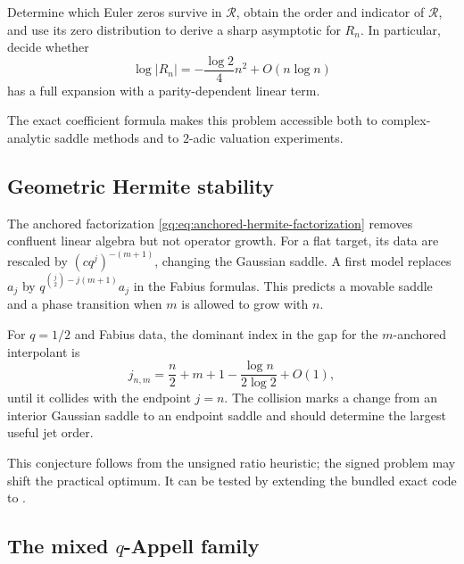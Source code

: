 \begin{problem}
\label{gq:prob:boundary-entire-zeros}
Determine which Euler zeros survive in $\mathcal R$, obtain the order and
indicator of $\mathcal R$, and use its zero distribution to derive a sharp
asymptotic for $R_n$.  In particular, decide whether
\begin{equation}
 \log|R_n|=-\frac{\log2}{4}n^2+O(n\log n)
 \label{gq:eq:boundary-residue-leading-question}
\end{equation}
has a full expansion with a parity-dependent linear term.
\end{problem}

The exact coefficient formula makes this problem accessible both to
complex-analytic saddle methods and to $2$-adic valuation experiments.

\subsection{Geometric Hermite stability}

The anchored factorization \eqref{gq:eq:anchored-hermite-factorization} removes
confluent linear algebra but not operator growth.  For a flat target, its
data are rescaled by $(cq^j)^{-(m+1)}$, changing the Gaussian saddle.
A first model replaces $a_j$ by
$q^{\binom j2-j(m+1)}a_j$ in the Fabius formulas.  This predicts a movable
saddle and a phase transition when $m$ is allowed to grow with $n$.

\begin{conjecture}
\label{gq:conj:hermite-saddle}
For $q=1/2$ and Fabius data, the dominant index in the gap for the
$m$-anchored interpolant is
\begin{equation}
 j_{n,m}=\frac n2+m+1-\frac{\log n}{2\log2}+O(1),
 \label{gq:eq:hermite-saddle-location-conj}
\end{equation}
until it collides with the endpoint $j=n$.  The collision marks a change
from an interior Gaussian saddle to an endpoint saddle and should determine
the largest useful jet order.
\end{conjecture}

This conjecture follows from the unsigned ratio heuristic; the signed
problem may shift the practical optimum.  It can be tested by extending the
bundled exact code to .

\subsection{The mixed \texorpdfstring{$q$}{q}-Appell family}

